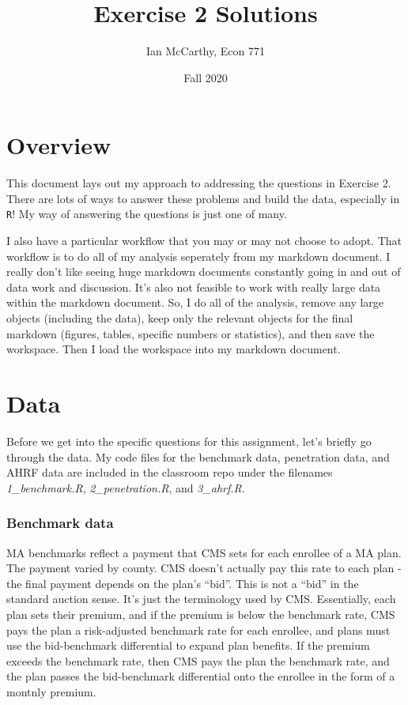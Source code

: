 \documentclass[
  12pt,
]{article}
\title{Exercise 2 Solutions}
\author{Ian McCarthy, Econ 771}
\date{Fall 2020}
\begin{document}
\maketitle


\hypertarget{overview}{%
\section{Overview}\label{overview}}

This document lays out my approach to addressing the questions in Exercise 2. There are lots of ways to answer these problems and build the data, especially in \texttt{R}! My way of answering the questions is just one of many.

I also have a particular workflow that you may or may not choose to adopt. That workflow is to do all of my analysis seperately from my markdown document. I really don't like seeing huge markdown documents constantly going in and out of data work and discussion. It's also not feasible to work with really large data within the markdown document. So, I do all of the analysis, remove any large objects (including the data), keep only the relevant objects for the final markdown (figures, tables, specific numbers or statistics), and then save the workspace. Then I load the workspace into my markdown document.

\hypertarget{data}{%
\section{Data}\label{data}}

Before we get into the specific questions for this assignment, let's briefly go through the data. My code files for the benchmark data, penetration data, and AHRF data are included in the classroom repo under the filenames \emph{1\_benchmark.R}, \emph{2\_penetration.R}, and \emph{3\_ahrf.R}.

\hypertarget{benchmark-data}{%
\subsubsection{Benchmark data}\label{benchmark-data}}

MA benchmarks reflect a payment that CMS sets for each enrollee of a MA plan. The payment varied by county. CMS doesn't actually pay this rate to each plan - the final payment depends on the plan's ``bid''. This is not a ``bid'' in the standard auction sense. It's just the terminology used by CMS. Essentially, each plan sets their premium, and if the premium is below the benchmark rate, CMS pays the plan a risk-adjusted benchmark rate for each enrollee, and plans must use the bid-benchmark differential to expand plan benefits. If the premium exceeds the benchmark rate, then CMS pays the plan the benchmark rate, and the plan passes the bid-benchmark differential onto the enrollee in the form of a montnly premium.
\end{document}
